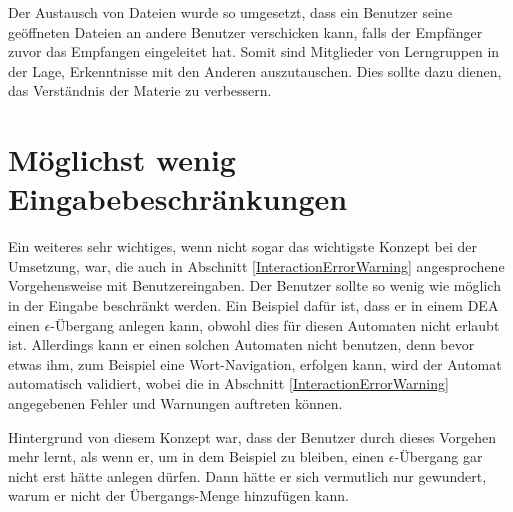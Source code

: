Der Austausch von Dateien wurde so umgesetzt, dass ein Benutzer seine
geöffneten Dateien an andere Benutzer verschicken kann, falls der Empfänger
zuvor das Empfangen eingeleitet hat. Somit sind Mitglieder von Lerngruppen in
der Lage, Erkenntnisse mit den Anderen auszutauschen. Dies sollte dazu dienen,
das Verständnis der Materie zu verbessern.\vspace{10pt}


\section{Möglichst wenig Eingabebeschränkungen}\label{ConceptsInput}

Ein weiteres sehr wichtiges, wenn nicht sogar das wichtigste Konzept bei der
Umsetzung, war, die auch in Abschnitt \ref{InteractionErrorWarning} angesprochene
Vorgehensweise mit Benutzereingaben. Der Benutzer sollte so wenig wie möglich in
der Eingabe beschränkt werden. Ein Beispiel dafür ist, dass er in einem DEA einen
$\epsilon$-Übergang anlegen kann, obwohl dies für diesen Automaten nicht erlaubt
ist. Allerdings kann er einen solchen Automaten nicht benutzen, denn bevor etwas
ihm, zum Beispiel eine Wort-Navigation, erfolgen kann, wird der Automat
automatisch validiert, wobei die in Abschnitt \ref{InteractionErrorWarning}
angegebenen Fehler und Warnungen auftreten können.\vspace{10pt}

Hintergrund von diesem Konzept war, dass der Benutzer durch dieses Vorgehen mehr
lernt, als wenn er, um in dem Beispiel zu bleiben, einen $\epsilon$-Übergang gar
nicht erst hätte anlegen dürfen. Dann hätte er sich vermutlich nur gewundert,
warum er \Symbol{$\epsilon$} nicht der Übergangs-Menge hinzufügen
kann.\vspace{10pt}
